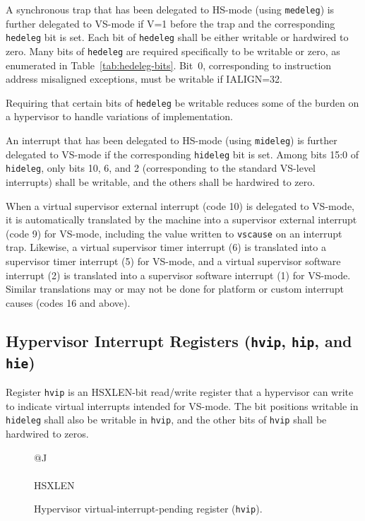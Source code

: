 A synchronous trap that has been delegated to HS-mode (using
{\tt medeleg}) is further delegated to VS-mode if V=1 before the trap and
the corresponding {\tt hedeleg} bit is set.
Each bit of {\tt hedeleg} shall be either writable or hardwired to zero.
Many bits of {\tt hedeleg} are required specifically to be writable or
zero, as enumerated in Table~\ref{tab:hedeleg-bits}.
Bit~0, corresponding to instruction address misaligned exceptions, must
be writable if IALIGN=32.

\begin{commentary}
Requiring that certain bits of {\tt hedeleg} be writable reduces some of
the burden on a hypervisor to handle variations of implementation.
\end{commentary}

An interrupt that has been delegated to HS-mode (using {\tt mideleg}) is
further delegated to VS-mode if the corresponding {\tt hideleg} bit is
set.
Among bits 15:0 of {\tt hideleg}, only bits 10, 6, and 2 (corresponding
to the standard VS-level interrupts) shall be writable, and the others
shall be hardwired to zero.

When a virtual supervisor external interrupt (code 10) is delegated to
VS-mode, it is automatically translated by the machine into a supervisor
external interrupt (code 9) for VS-mode, including the value written to
{\tt vscause} on an interrupt trap.
Likewise, a virtual supervisor timer interrupt (6) is translated into a
supervisor timer interrupt (5) for VS-mode, and a virtual supervisor
software interrupt (2) is translated into a supervisor software interrupt
(1) for VS-mode.
Similar translations may or may not be done for platform or custom
interrupt causes (codes 16 and above).

\subsection{Hypervisor Interrupt Registers ({\tt hvip}, {\tt hip}, and {\tt hie})}
\label{sec:hinterruptregs}

Register {\tt hvip} is an HSXLEN-bit read/write register that a
hypervisor can write to indicate virtual interrupts intended for VS-mode.
The bit positions writable in {\tt hideleg} shall also be writable in
{\tt hvip}, and the other bits of {\tt hvip} shall be hardwired to zeros.

\begin{figure}[h!]
{\footnotesize
\begin{center}
\begin{tabular}{@{}J}
 \\
\hline
{} \\
\hline
HSXLEN \\
\end{tabular}
\end{center}
}
\vspace{-0.1in}
\caption{Hypervisor virtual-interrupt-pending register ({\tt hvip}).}
\label{hvipreg}
\end{figure}

